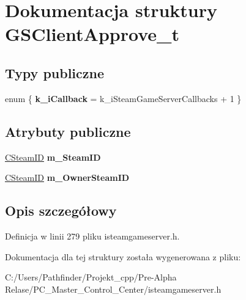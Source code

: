 \hypertarget{struct_g_s_client_approve__t}{}\section{Dokumentacja struktury G\+S\+Client\+Approve\+\_\+t}
\label{struct_g_s_client_approve__t}
\subsection*{Typy publiczne}
\begin{DoxyCompactItemize}
\item 
\mbox{\label{struct_g_s_client_approve__t_ae47551e503ac4358215f076353a782f1}} 
enum \{ {\bfseries k\+\_\+i\+Callback} = k\+\_\+i\+Steam\+Game\+Server\+Callbacks + 1
 \}
\end{DoxyCompactItemize}
\subsection*{Atrybuty publiczne}
\begin{DoxyCompactItemize}
\item 
\mbox{\label{struct_g_s_client_approve__t_a018bce91fbb1a639135118001f1fb151}} 
\hyperlink{class_c_steam_i_d}{C\+Steam\+ID} {\bfseries m\+\_\+\+Steam\+ID}
\item 
\mbox{\label{struct_g_s_client_approve__t_a703ba66bf360a406705535f5ca1cddbc}} 
\hyperlink{class_c_steam_i_d}{C\+Steam\+ID} {\bfseries m\+\_\+\+Owner\+Steam\+ID}
\end{DoxyCompactItemize}


\subsection{Opis szczegółowy}


Definicja w linii 279 pliku isteamgameserver.\+h.



Dokumentacja dla tej struktury została wygenerowana z pliku\+:\begin{DoxyCompactItemize}
\item 
C\+:/\+Users/\+Pathfinder/\+Projekt\+\_\+cpp/\+Pre-\/\+Alpha Relase/\+P\+C\+\_\+\+Master\+\_\+\+Control\+\_\+\+Center/isteamgameserver.\+h\end{DoxyCompactItemize}
